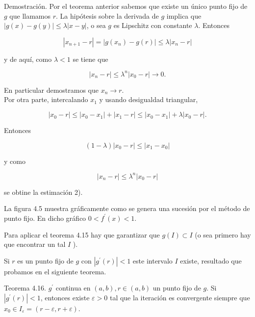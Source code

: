 \documentclass[10pt]{book}
\begin{document}
Demostración. Por el teorema anterior sabemos que existe un único punto fijo de $g$ que llamamos $r$. La hipótesis sobre la derivada de $g$ implica que $|g(x)-g(y)| \leq \lambda|x-y|$, o sea $g$ es Lipschitz con constante $\lambda$. Entonces

$$
\left|x_{n+1}-r\right|=\left|g\left(x_{n}\right)-g(r)\right| \leq \lambda\left|x_{n}-r\right|
$$

y de aquí, como $\lambda<1$ se tiene que

$$
\left|x_{n}-r\right| \leq \lambda^{n}\left|x_{0}-r\right| \rightarrow 0 .
$$

En particular demostramos que $x_{n} \rightarrow r$.\\
Por otra parte, intercalando $x_{1}$ y usando desigualdad triangular,

$$
\left|x_{0}-r\right| \leq\left|x_{0}-x_{1}\right|+\left|x_{1}-r\right| \leq\left|x_{0}-x_{1}\right|+\lambda\left|x_{0}-r\right| .
$$

Entonces

$$
(1-\lambda)\left|x_{0}-r\right| \leq\left|x_{1}-x_{0}\right|
$$

y como

$$
\left|x_{n}-r\right| \leq \lambda^{n}\left|x_{0}-r\right|
$$

se obtine la estimación 2).

La figura 4.5 muestra gráficamente como se genera una sucesión por el método de punto fijo. En dicho gráfico $0<f^{\prime}(x)<1$.

Para aplicar el teorema 4.15 hay que garantizar que $g(I) \subset I$ (o sea primero hay que encontrar un tal $I$ ).

Si $r$ es un punto fijo de $g$ con $\left|g^{\prime}(r)\right|<1$ este intervalo $I$ existe, resultado que probamos en el siguiente teorema.

Teorema 4.16. $g^{\prime}$ continua en $(a, b), r \in(a, b)$ un punto fijo de $g$. Si $\left|g^{\prime}(r)\right|<1$, entonces existe $\varepsilon>0$ tal que la iteración es convergente siempre que $x_{0} \in I_{\varepsilon}=(r-\varepsilon, r+\varepsilon)$.
\end{document}

